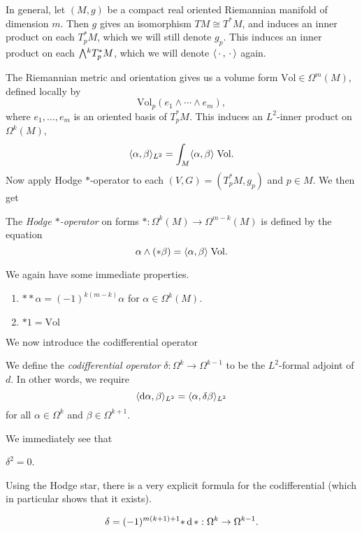 \documentclass[a4paper]{article}
\newcommand\Vol{\mathrm{Vol}}
\begin{document}
In general, let $(M, g)$ be a compact real oriented Riemannian manifold of dimension $m$. Then $g$ gives an isomorphism $TM \cong T^*M$, and induces an inner product on each $T_p^* M$, which we will still denote $g_p$. This induces an inner product on each $\exterior^k T_p^*M$, which we will denote $\langle \,\cdot\,, \,\cdot\, \rangle$ again.

The Riemannian metric and orientation gives us a volume form $\Vol \in \Omega^m(M)$, defined locally by
\[
  \Vol_p(e_1 \wedge \cdots \wedge e_m),
\]
where $e_1, \ldots, e_m$ is an oriented basis of $T_p^*M$. This induces an $L^2$-inner product on $\Omega^k(M)$,
\[
  \bra \alpha, \beta\ket_{L^2} = \int_M \bra \alpha, \beta\ket\;\Vol.
\]
Now apply Hodge $*$-operator to each $(V, G) = (T_p^* M, g_p)$ and $p \in M$. We then get
\begin{defi}\index{$*$}
  The \emph{Hodge $*$-operator} on forms $*: \Omega^k(M) \to \Omega^{m - k}(M)$ is defined by the equation
  \[
    \alpha \wedge (*\beta) = \bra \alpha ,\beta\ket \; \Vol.
  \]
\end{defi}

We again have some immediate properties.
\begin{prop}\leavevmode
  \begin{enumerate}
    \item $**\alpha = (-1)^{k(m - k)} \alpha$ for $\alpha \in \Omega^k(M)$.
    \item $*1 = \Vol$\fakeqed
  \end{enumerate}
\end{prop}

We now introduce the codifferential operator
\begin{defi}\index{$\delta$}
  We define the \emph{codifferential operator} $\delta: \Omega^k \to \Omega^{k - 1}$ to be the $L^2$-formal adjoint of $d$. In other words, we require
  \[
    \langle \mathrm{d} \alpha, \beta\rangle_{L^2} = \langle \alpha, \delta \beta\rangle_{L^2}
  \]
  for all $\alpha \in \Omega^k$ and $\beta \in \Omega^{k + 1}$.
\end{defi}
We immediately see that
\begin{prop}
  $\delta^2 = 0$.
\end{prop}

Using the Hodge star, there is a very explicit formula for the codifferential (which in particular shows that it exists).
\begin{prop}
  \[
    \delta = (-1)^{m(k + 1) + 1} {*\,\mathrm{d}\, *} : \Omega^k \to \Omega^{k - 1}.
  \]
\end{prop}
\end{document}
